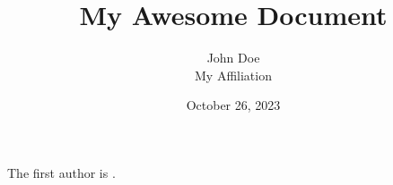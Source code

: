 \documentclass{article}
\title{My Awesome Document}
\author{John Doe \\ \small My Affiliation}
\date{October 26, 2023}
\begin{document}

The first author is \getWorkAuthor.
\maketitle
\end{document}

